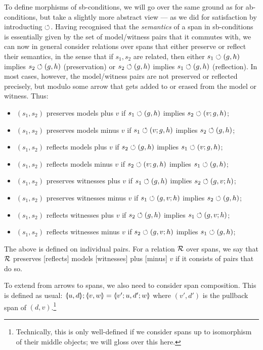 To define morphisms of sb-conditions, we will go over the same ground as for ab-conditions, but take a slightly more abstract view --- as we did for satisfaction by introducting $\circlearrowleft$. Having recognised that the \emph{semantics} of a span in sb-conditions is essentially given by the set of model/witness pairs that it commutes with, we can now in general consider relations over spans that either preserve or reflect their semantics, in the sense that if $s_1,s_2$ are related, then either $s_1\circlearrowleft (g,h)$ implies $s_2\circlearrowleft (g,h)$ (preservation) or $s_2\circlearrowleft (g,h)$ implies $s_1\circlearrowleft (g,h)$ (reflection). In most cases, however, the model/witness pairs are not preserved or reflected precisely, but modulo some arrow that gets added to or erased from the model or witness. Thus:
%
\begin{itemize}
\item $(s_1,s_2)$ preserves models plus $v$ if $s_1\circlearrowleft (g,h)$ implies $s_2\circlearrowleft (v;g,h)$;
\item $(s_1,s_2)$ preserves models minus $v$ if $s_1\circlearrowleft (v;g,h)$ implies $s_2\circlearrowleft (g,h)$;
\item $(s_1,s_2)$ reflects models plus $v$ if $s_2\circlearrowleft (g,h)$ implies $s_1\circlearrowleft (v;g,h)$;
\item $(s_1,s_2)$ reflects models minus $v$ if $s_2\circlearrowleft (v;g,h)$ implies $s_1\circlearrowleft (g,h)$;
\item $(s_1,s_2)$ preserves witnesses plus $v$ if $s_1\circlearrowleft (g,h)$ implies $s_2\circlearrowleft (g,v;h)$;
\item $(s_1,s_2)$ preserves witnesses minus $v$ if $s_1\circlearrowleft (g,v;h)$ implies $s_2\circlearrowleft (g,h)$;
\item $(s_1,s_2)$ reflects witnesses plus $v$ if $s_2\circlearrowleft (g,h)$ implies $s_1\circlearrowleft (g,v;h)$;
\item $(s_1,s_2)$ reflects witnesses minus $v$ if $s_2\circlearrowleft (g,v;h)$ implies $s_1\circlearrowleft (g,h)$;
\end{itemize}
%
The above is defined on individual pairs. For a relation $\mathcal{R}$ over spans, we say that $\mathcal{R}$ preserves [reflects] models [witnesses] plus [minus] $v$ if it consists of pairs that do so.

To extend  from arrows to spans, we also need to consider span composition. This is defined as usual: $\spanof u d;\spanof v w=\spanof{v';u}{d';w}$ where $(v',d')$ is the pullback span of $(d,v)$.\footnote{Technically, this is only well-defined if we consider spans up to isomorphism of their middle objects; we will gloss over this here.}

